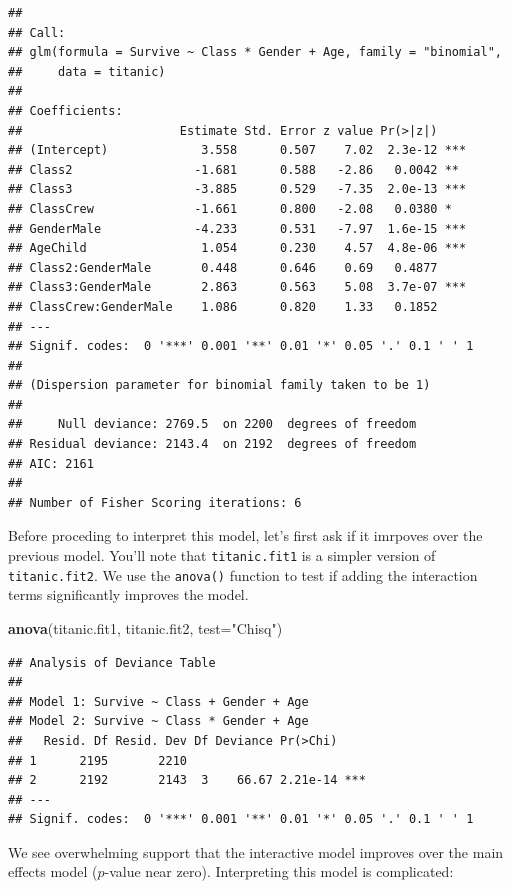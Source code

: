 \documentclass[
]{book}
\newenvironment{Shaded}{\begin{snugshade}}{\end{snugshade}}
\newcommand{\AttributeTok}[1]{\textcolor[rgb]{0.13,0.29,0.53}{#1}}
\newcommand{\FunctionTok}[1]{\textcolor[rgb]{0.13,0.29,0.53}{\textbf{#1}}}
\newcommand{\NormalTok}[1]{#1}
\newcommand{\StringTok}[1]{\textcolor[rgb]{0.31,0.60,0.02}{#1}}
\begin{document}
\begin{verbatim}
## 
## Call:
## glm(formula = Survive ~ Class * Gender + Age, family = "binomial", 
##     data = titanic)
## 
## Coefficients:
##                      Estimate Std. Error z value Pr(>|z|)    
## (Intercept)             3.558      0.507    7.02  2.3e-12 ***
## Class2                 -1.681      0.588   -2.86   0.0042 ** 
## Class3                 -3.885      0.529   -7.35  2.0e-13 ***
## ClassCrew              -1.661      0.800   -2.08   0.0380 *  
## GenderMale             -4.233      0.531   -7.97  1.6e-15 ***
## AgeChild                1.054      0.230    4.57  4.8e-06 ***
## Class2:GenderMale       0.448      0.646    0.69   0.4877    
## Class3:GenderMale       2.863      0.563    5.08  3.7e-07 ***
## ClassCrew:GenderMale    1.086      0.820    1.33   0.1852    
## ---
## Signif. codes:  0 '***' 0.001 '**' 0.01 '*' 0.05 '.' 0.1 ' ' 1
## 
## (Dispersion parameter for binomial family taken to be 1)
## 
##     Null deviance: 2769.5  on 2200  degrees of freedom
## Residual deviance: 2143.4  on 2192  degrees of freedom
## AIC: 2161
## 
## Number of Fisher Scoring iterations: 6
\end{verbatim}

Before proceding to interpret this model, let's first ask if it imrpoves over the previous model. You'll note that \texttt{titanic.fit1} is a simpler version of \texttt{titanic.fit2}. We use the \texttt{anova()} function to test if adding the interaction terms significantly improves the model.

\begin{Shaded}
\begin{Highlighting}[]
\FunctionTok{anova}\NormalTok{(titanic.fit1, titanic.fit2, }\AttributeTok{test=}\StringTok{"Chisq"}\NormalTok{)}
\end{Highlighting}
\end{Shaded}

\begin{verbatim}
## Analysis of Deviance Table
## 
## Model 1: Survive ~ Class + Gender + Age
## Model 2: Survive ~ Class * Gender + Age
##   Resid. Df Resid. Dev Df Deviance Pr(>Chi)    
## 1      2195       2210                         
## 2      2192       2143  3    66.67 2.21e-14 ***
## ---
## Signif. codes:  0 '***' 0.001 '**' 0.01 '*' 0.05 '.' 0.1 ' ' 1
\end{verbatim}

We see overwhelming support that the interactive model improves over the main effects model (\(p\)-value near zero). Interpreting this model is complicated:
\end{document}
